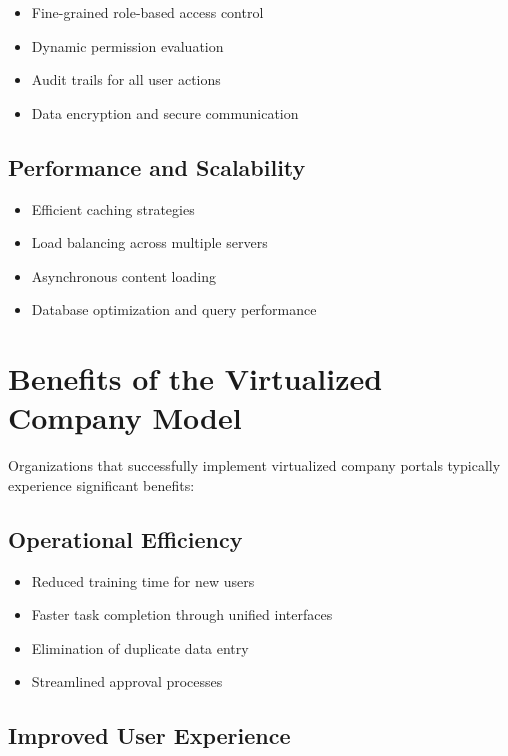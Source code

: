 \begin{itemize}
    \item Fine-grained role-based access control
    \item Dynamic permission evaluation
    \item Audit trails for all user actions
    \item Data encryption and secure communication
\end{itemize}

\subsection{Performance and Scalability}

\begin{itemize}
    \item Efficient caching strategies
    \item Load balancing across multiple servers
    \item Asynchronous content loading
    \item Database optimization and query performance
\end{itemize}

\section{Benefits of the Virtualized Company Model}
\label{sec:benefits}

Organizations that successfully implement virtualized company portals typically experience significant benefits:

\subsection{Operational Efficiency}

\begin{itemize}
    \item Reduced training time for new users
    \item Faster task completion through unified interfaces
    \item Elimination of duplicate data entry
    \item Streamlined approval processes
\end{itemize}

\subsection{Improved User Experience}

